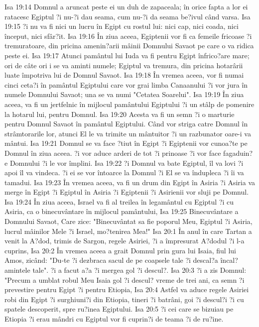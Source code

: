 Isa 19:14  Domnul a aruncat peste ei un duh de zapaceala; în orice fapta a lor ei ratacesc Egiptul ?i nu-?i dau seama, cum nu-?i da seama be?ivul când varsa.
Isa 19:15  ?i nu va fi nici un lucru în Egipt cu rostul lui: nici cap, nici coada, nici început, nici sfâr?it.
Isa 19:16  În ziua aceea, Egiptenii vor fi ca femeile fricoase ?i tremuratoare, din pricina amenin?arii mâinii Domnului Savaot pe care o va ridica peste ei.
Isa 19:17  Atunci pamântul lui Iuda va fi pentru Egipt înfrico?are mare; ori de câte ori i se va aminti numele; Egiptul va tremura, din pricina hotarârii luate împotriva lui de Domnul Savaot.
Isa 19:18  În vremea aceea, vor fi numai cinci ceta?i în pamântul Egiptului care vor grai limba Canaanului ?i vor jura în numele Domnului Savaot; una se va numi "Cetatea Soarelui".
Isa 19:19  În ziua aceea, va fi un jertfelnic în mijlocul pamântului Egiptului ?i un stâlp de pomenire la hotarul lui, pentru Domnul.
Isa 19:20  Acesta va fi un semn ?i o marturie pentru Domnul Savaot în pamântul Egiptului. Când vor striga catre Domnul în strâmtorarile lor, atunci El le va trimite un mântuitor ?i un razbunator oare-i va mântui.
Isa 19:21  Domnul se va face ?tiut în Egipt ?i Egiptenii vor cunoa?te pe Domnul în ziua aceea. ?i vor aduce arderi de tot ?i prinoase ?i vor face fagaduin?e Domnului ?i le vor împlini.
Isa 19:22  ?i Domnul va bate Egiptul, îl va lovi ?i apoi îl va vindeca. ?i ei se vor întoarce la Domnul ?i El se va îndupleca ?i îi va tamadui.
Isa 19:23  În vremea aceea, va fi un drum din Egipt în Asiria ?i Asiria va merge în Egipt ?i Egiptul în Asiria ?i Egiptenii ?i Asirienii vor sluji pe Domnul.
Isa 19:24  În ziua aceea, Israel va fi al treilea în legamântul cu Egiptul ?i cu Asiria, ca o binecuvântare în mijlocul pamântului,
Isa 19:25  Binecuvântare a Domnului Savaot, Care zice: "Binecuvântat sa fie poporul Meu, Egiptul ?i Asiria, lucrul mâinilor Mele ?i Israel, mo?tenirea Mea!"
Isa 20:1  În anul în care Tartan a venit la A?dod, trimis de Sargon, regele Asiriei, ?i a împresurat A?dodul ?i l-a cuprins,
Isa 20:2  În vremea aceea a grait Domnul prin gura lui Isaia, fiul lui Amos, zicând: "Du-te ?i dezbraca sacul de pe coapsele tale ?i descal?a încal?amintele tale". ?i a facut a?a ?i mergea gol ?i descul?.
Isa 20:3  ?i a zis Domnul: "Precum a umblat robul Meu Isaia gol ?i descul? vreme de trei ani, ca semn ?i prevestire pentru Egipt ?i pentru Etiopia,
Isa 20:4  Astfel va aduce regele Asiriei robi din Egipt ?i surghiuni?i din Etiopia, tineri ?i batrâni, goi ?i descul?i ?i cu spatele descoperit, spre ru?inea Egiptului.
Isa 20:5  ?i cei care se bizuiau pe Etiopia ?i erau mândri cu Egiptul vor fi cuprin?i de teama ?i de ru?ine.
